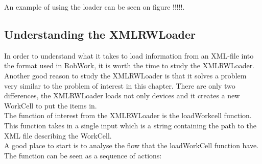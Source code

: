 An example of using the loader can be seen on figure !!!!!.


\subsection{Understanding the XMLRWLoader}
In order to understand what it takes to load information from an XML-file into the format used in RobWork, it is worth the time to study the XMLRWLoader. Another good reason to study the XMLRWLoader is that it solves a problem very similar to the problem of interest in this chapter. There are only two differences, the XMLRWLoader loads not only devices and it creates a new WorkCell to put the items in.\\

The function of interest from the XMLRWLoader is the loadWorkcell function. This function takes in a single input which is a string containing the path to the XML file describing the WorkCell.\\
A good place to start is to analyse the flow that the loadWorkCell function have. The function can be seen as a sequence of actions:

